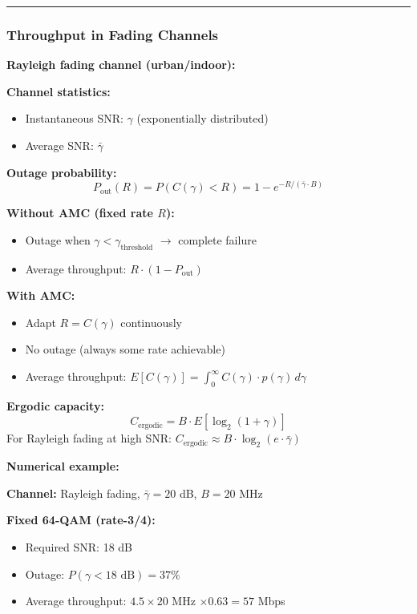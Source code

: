 \begin{center}\rule{0.5\linewidth}{0.5pt}\end{center}

\subsubsection{Throughput in Fading
Channels}\label{throughput-in-fading-channels}

\textbf{Rayleigh fading channel (urban/indoor):}

\textbf{Channel statistics:}
\begin{itemize}
\item Instantaneous SNR: $\gamma$ (exponentially distributed)
\item Average SNR: $\bar{\gamma}$
\end{itemize}

\textbf{Outage probability:}
\begin{equation*}
P_{\text{out}}(R) = P(C(\gamma) < R) = 1 - e^{-R / (\bar{\gamma} \cdot B)}
\end{equation*}

\textbf{Without AMC (fixed rate $R$):}
\begin{itemize}
\item Outage when $\gamma < \gamma_{\text{threshold}}$ $\rightarrow$ complete failure
\item Average throughput: $R \cdot (1 - P_{\text{out}})$
\end{itemize}

\textbf{With AMC:}
\begin{itemize}
\item Adapt $R = C(\gamma)$ continuously
\item No outage (always some rate achievable)
\item Average throughput: $E[C(\gamma)] = \int_0^\infty C(\gamma) \cdot p(\gamma) \, d\gamma$
\end{itemize}

\textbf{Ergodic capacity:}
\begin{equation*}
C_{\text{ergodic}} = B \cdot E[\log_2(1 + \gamma)]
\end{equation*}
For Rayleigh fading at high SNR: $C_{\text{ergodic}} \approx B \cdot \log_2(e \cdot \bar{\gamma})$

\textbf{Numerical example:}

\textbf{Channel:} Rayleigh fading, $\bar{\gamma} = 20$ dB, $B = 20$ MHz

\textbf{Fixed 64-QAM (rate-3/4):}
\begin{itemize}
\item Required SNR: 18 dB
\item Outage: $P(\gamma < 18 \text{ dB}) = 37\%$
\item Average throughput: $4.5 \times 20$ MHz $\times 0.63 = 57$ Mbps
\end{itemize}

